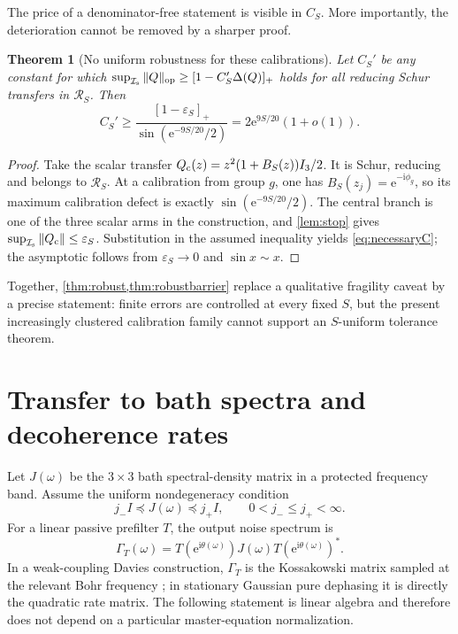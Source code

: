 \documentclass[11pt]{article}
\newtheorem{theorem}{Theorem}[section]
\theoremstyle{definition}
\theoremstyle{remark}
\newcommand{\cR}{\mathcal{R}}
\newcommand{\cI}{\mathcal{I}}
\newcommand{\op}{\mathrm{op}}
\newcommand{\e}{\mathrm{e}}
\begin{document}
The price of a denominator-free statement is visible in $C_S$.  More
importantly, the deterioration cannot be removed by a sharper proof.

\begin{theorem}[No uniform robustness for these calibrations]\label{thm:robustbarrier}
Let $C_S'$ be any constant for which
$\sup_{\cI_{\rm s}}\|Q\|_{\op}\geq[1-C_S'\Delta(Q)]_+$ holds for all reducing
Schur transfers in $\cR_S$.  Then
\begin{equation}\label{eq:necessaryC}
 C_S'\geq
 \frac{[1-\varepsilon_S]_+}{\sin(\e^{-9S/20}/2)}
 =2\e^{9S/20}(1+o(1)).
\end{equation}
\end{theorem}

\begin{proof}
Take the scalar transfer
$Q_{\rm c}(z)=z^2(1+B_S(z))I_3/2$.  It is Schur, reducing and belongs to
$\cR_S$.  At a calibration from group $g$, one has
$B_S(z_j)=\e^{-\mathrm{i}\phi_g}$, so its maximum calibration defect is
exactly $\sin(\e^{-9S/20}/2)$.  The central branch is one of the three scalar
arms in the construction, and \cref{lem:stop} gives
$\sup_{\cI_{\rm s}}\|Q_{\rm c}\|\leq\varepsilon_S$.  Substitution in the
assumed inequality yields \eqref{eq:necessaryC}; the asymptotic follows from
$\varepsilon_S\to0$ and $\sin x\sim x$.
\end{proof}

Together, \cref{thm:robust,thm:robustbarrier} replace a qualitative fragility
caveat by a precise statement: finite errors are controlled at every fixed
$S$, but the present increasingly clustered calibration family cannot support
an $S$-uniform tolerance theorem.

\section{Transfer to bath spectra and decoherence rates}

Let $J(\omega)$ be the $3\times3$ bath spectral-density matrix in a protected
frequency band.  Assume the uniform nondegeneracy condition
\begin{equation}\label{eq:bathbounds}
 j_-I\preceq J(\omega)\preceq j_+I,
 \qquad 0<j_-\leq j_+<\infty.
\end{equation}
For a linear passive prefilter $T$, the output noise spectrum is
\begin{equation}\label{eq:koss}
 \Gamma_T(\omega)=T(\e^{\mathrm{i}\theta(\omega)})
 J(\omega)T(\e^{\mathrm{i}\theta(\omega)})^*.
\end{equation}
In a weak-coupling Davies construction, $\Gamma_T$ is the Kossakowski matrix
sampled at the relevant Bohr frequency \cite{Davies1974}; in stationary
Gaussian pure dephasing it is directly the quadratic rate matrix.  The
following statement is linear algebra and therefore does not depend on a
particular master-equation normalization.
\end{document}

